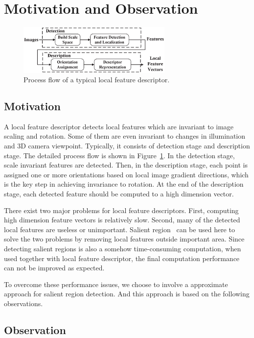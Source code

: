 \section{Motivation and Observation}
\label{sec:observation}

\begin{figure}
	\centering
	\includegraphics[width=3.0in]{images/fig-workflow.eps}
	\caption{Process flow of a typical local feature descriptor.}
	\label{fig:workflow}
\end{figure}

\subsection{Motivation}

A local feature descriptor detects local features which are invariant to image scaling and rotation. Some of them are even invariant to changes in illumination and 3D camera viewpoint. Typically, it consists of detection stage and description stage. The detailed process flow is shown in Figure~\ref{fig:workflow}. In the detection stage, scale invariant features are detected. Then, in the description stage, each point is assigned one or more orientations based on local image gradient directions, which is the key step in achieving invariance to rotation. At the end of the description stage, each detected feature should be computed to a high dimension vector.

There exist two major problems for local feature descriptors. First, computing high dimension feature vectors is relatively slow. Second, many of the detected local features are useless or unimportant. Salient region~\cite{huang2009image,liang2010salient} can be used here to solve the two problems by removing local features outside important area. Since detecting salient regions is also a somehow time-consuming computation, when used together with local feature descriptor, the final computation performance can not be improved as expected.

To overcome these performance issues, we choose to involve a approximate approach for salient region detection. And this approach is based on the following observations.

\subsection{Observation}

